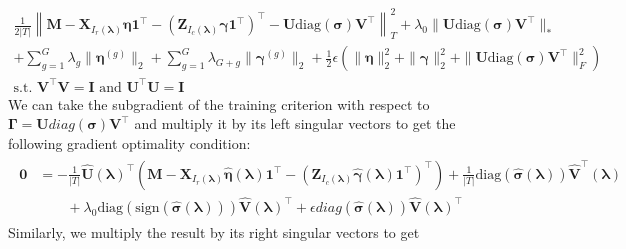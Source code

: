\documentclass[12pt,letterpaper]{article}
\begin{document}
\begin{equation}
\begin{array}{c}
\frac{1}{2|T|} 
\left \| 
\boldsymbol{M} 
- \boldsymbol{X}_{I_r(\boldsymbol{\lambda})} \boldsymbol{\eta} \boldsymbol{1}^\top 
- (\boldsymbol{Z}_{I_c(\boldsymbol{\lambda})} \boldsymbol{\gamma}  \boldsymbol{1}^\top )^\top
- \boldsymbol{U} \text{diag}(\boldsymbol{\sigma}) \boldsymbol{V}^\top
\right \|^2_T
+ \lambda_0 \| \boldsymbol{U} \text{diag}(\boldsymbol{\sigma}) \boldsymbol{V}^\top \|_*
 \\
+ \sum_{g=1}^G  \lambda_g \| \boldsymbol\eta^{(g)} \|_2
+ \sum_{g=1}^G  \lambda_{G+g} \| \boldsymbol\gamma^{(g)} \|_2
+ \frac{1}{2} \epsilon \left (
\| \boldsymbol\eta \|_2^2 + \| \boldsymbol\gamma \|_2^2 
+ \|\boldsymbol{U} \text{diag}(\boldsymbol{\sigma}) \boldsymbol{V}^\top\|^2_F
\right )
\\
\text{s.t. } \boldsymbol{V}^\top \boldsymbol{V} = \boldsymbol{I}
\text{ and } \boldsymbol{U}^\top \boldsymbol{U} = \boldsymbol{I}
\end{array}
\end{equation}
We can take the subgradient of the training criterion with respect to $\boldsymbol{\Gamma} = \boldsymbol{U} diag(\boldsymbol{\sigma}) \boldsymbol{V}^\top$ and multiply it by its left singular vectors to get the following gradient optimality condition:
\begin{align}
\begin{split}
\boldsymbol{0} & = 
- \frac{1}{|T|} 
\hat{\boldsymbol{U}}(\boldsymbol{\lambda})^\top
\left (
\boldsymbol{M} 
- \boldsymbol{X}_{I_r(\boldsymbol{\lambda})} \hat{\boldsymbol{\eta}}(\boldsymbol{\lambda}) \boldsymbol{1}^\top 
- (\boldsymbol{Z}_{I_c(\boldsymbol{\lambda})} \hat{\boldsymbol{\gamma}}(\boldsymbol{\lambda})  \boldsymbol{1}^\top )^\top
\right )
+ \frac{1}{|T|} \text{diag}(\hat{\boldsymbol{\sigma}}(\boldsymbol{\lambda})) \hat{\boldsymbol{V}}^\top(\boldsymbol{\lambda})
\\
& \qquad + \lambda_0 \text{diag}(\text{sign}(\hat{\boldsymbol{\sigma}}(\boldsymbol{\lambda}))) \hat{\boldsymbol{V}}(\boldsymbol{\lambda})^\top
+ \epsilon diag(\hat{\boldsymbol{\sigma}}(\boldsymbol{\lambda})) \hat{\boldsymbol{V}}(\boldsymbol{\lambda})^\top
\end{split}
\label{eq:grad_opt_matrix_left}
\end{align}
Similarly, we multiply the result by its right singular vectors to get
\end{document}
